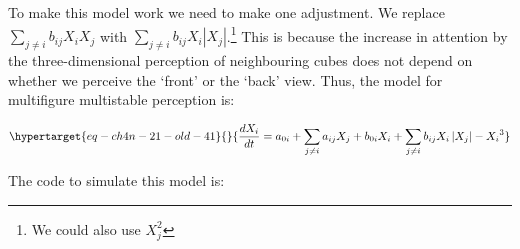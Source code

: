 \documentclass[
  a4paper,
  DIV=11,
  numbers=noendperiod,
  oneside]{scrreprt}
\begin{document}
To make this model work we need to make one adjustment. We replace
\(\sum_{j \neq i}^{}{b_{ij}X_{i}X_{j}}\) with
\(\sum_{j \neq i}^{}{b_{ij}X_{i}|X_{j}|}\).\footnote{We could also use
  \(X_j^2\)} This is because the increase in attention by the
three-dimensional perception of neighbouring cubes does not depend on
whether we perceive the `front' or the `back' view. Thus, the model for
multifigure multistable perception is:

\begin{equation}\protect\hypertarget{eq-ch4n-21-old-41}{}{
\frac{dX_{i}}{dt} = a_{0i} + \sum_{j \neq i}^{}{a_{ij}X_{j}} + b_{0i}X_{i} + \sum_{j \neq i}^{}{b_{ij}X_{i}\left| X_{j} \right|} - {X_{i}}^{3}
}\label{eq-ch4n-21-old-41}\end{equation}

The code to simulate this model is:
\end{document}
